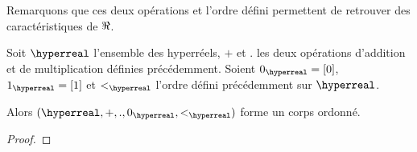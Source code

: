 Remarquons que ces deux opérations et l'ordre défini permettent de retrouver des
caractéristiques de $\real$.

\begin{proposition}
	Soit $\hyperreal$ l'ensemble des hyperréels, $+$ et $.$ les deux opérations
	d'addition et de multiplication définies précédemment.
	Soient $0_{\hyperreal} = [0]$, $1_{\hyperreal} = [1]$ et $<_{\hyperreal}$
	l'ordre défini précédemment sur $\hyperreal$.

	Alors $(\hyperreal, +, ., 0_{\hyperreal}, <_{\hyperreal})$ forme un corps
	ordonné.
\end{proposition}

\ifdefined\outputproof
\begin{proof}

\end{proof}
\fi
